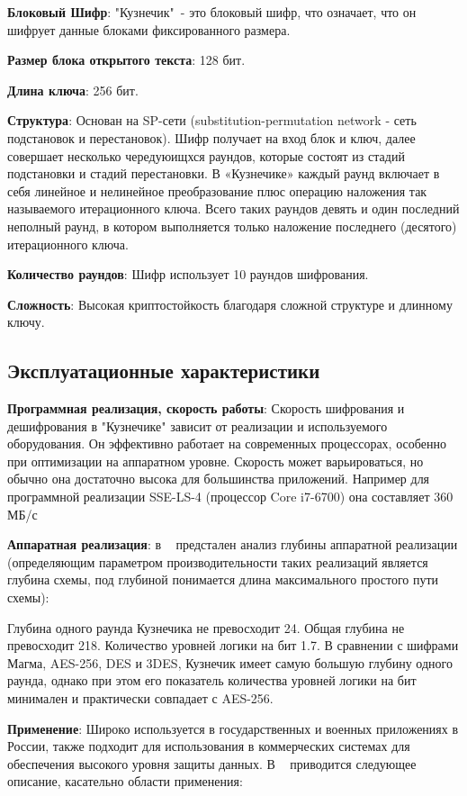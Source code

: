 \documentclass[colorthm]{../civarticle}
\begin{document}
\textbf{Блоковый Шифр}: "Кузнечик"\ - это блоковый шифр, что означает, что он шифрует данные блоками фиксированного размера.

\textbf{Размер блока открытого текста}: 128 бит.

\textbf{Длина ключа}: 256 бит.

\textbf{Структура}: Основан на SP-сети (substitution-permutation network - сеть подстановок и перестановок). Шифр получает на вход блок и ключ, далее совершает несколько чередуюищхся раундов, которые состоят из стадий подстановки и стадий перестановки. В «Кузнечике» каждый раунд включает в себя линейное и нелинейное преобразование плюс операцию наложения так называемого итерационного ключа. Всего таких раундов девять и один последний неполный раунд, в котором выполняется только наложение последнего (десятого) итерационного ключа.


\textbf{Количество раундов}: Шифр использует 10 раундов шифрования.

\textbf{Сложность}: Высокая криптостойкость благодаря сложной структуре и длинному ключу.

\subsection{Эксплуатационные характеристики}

\textbf{Программная реализация, скорость работы}: Скорость шифрования и дешифрования в "Кузнечике" зависит от реализации и используемого оборудования. Он эффективно работает на современных процессорах, особенно при оптимизации на аппаратном уровне. Скорость может варьироваться, но обычно она достаточно высока для большинства приложений. Например для программной реализации SSE-LS-4 (процессор Core i7-6700) она составляет 360 МБ/с ~\cite{speed}


\textbf{Аппаратная реализация}: в ~\cite{appspeed} предстален анализ глубины аппаратной реализации (определяющим параметром производительности таких реализаций
является глубина схемы, под глубиной понимается длина максимального
простого пути схемы):

Глубина одного раунда Кузнечика не превосходит 24. Общая глубина не превосходит 218. Количество уровней логики на бит 1.7. В сравнении с шифрами Магма, AES-256, DES и 3DES, Кузнечик имеет самую большую глубину одного раунда, однако при этом его показатель количества уровней логики на бит минимален и практически совпадает с AES-256. 

\textbf{Применение}: Широко используется в государственных и военных приложениях в России, также подходит для использования в коммерческих системах для обеспечения высокого уровня защиты данных.
В ~\cite{gost2015} приводится следующее описание, касательно области применения:
\end{document}
